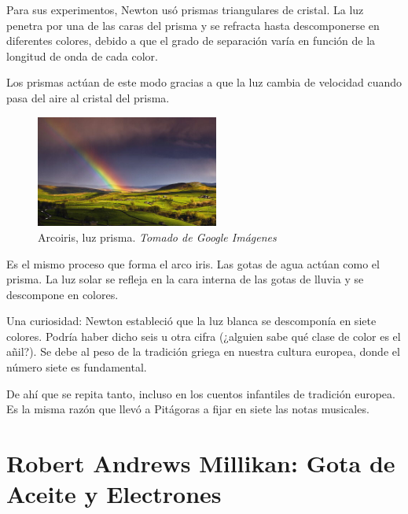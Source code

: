 \documentclass[journal]{IEEEtran}
\begin{document}
Para sus experimentos, Newton usó prismas triangulares de cristal. La luz penetra por una de las caras del prisma y se refracta hasta descomponerse en diferentes colores, debido a que el grado de separación varía en función de la longitud de onda de cada color. 

Los prismas actúan de este modo gracias a que la luz cambia de velocidad cuando pasa del aire al cristal del prisma.

\begin{center}
  \begin{figure}[h!]
  \includegraphics[width=60mm]{arcoiris.jpg}
  \caption{Arcoiris, luz prisma. \emph{Tomado de Google Imágenes}}
  \end{figure}
\end{center}

Es el mismo proceso que forma el arco iris. Las gotas de agua actúan como el prisma. La luz solar se refleja en la cara interna de las gotas de lluvia y se descompone en colores.

Una curiosidad: Newton estableció que la luz blanca se descomponía en siete colores. Podría haber dicho seis u otra cifra (¿alguien sabe qué clase de color es el añil?). Se debe al peso de la tradición griega en nuestra cultura europea, donde el número siete es fundamental. 

De ahí que se repita tanto, incluso en los cuentos infantiles de tradición europea. Es la misma razón que llevó a Pitágoras a fijar en siete las notas musicales.








\hfill \break\hfill \break\hfill \break\hfill \break
\section{Robert Andrews Millikan: Gota de Aceite y Electrones}
\end{document}
